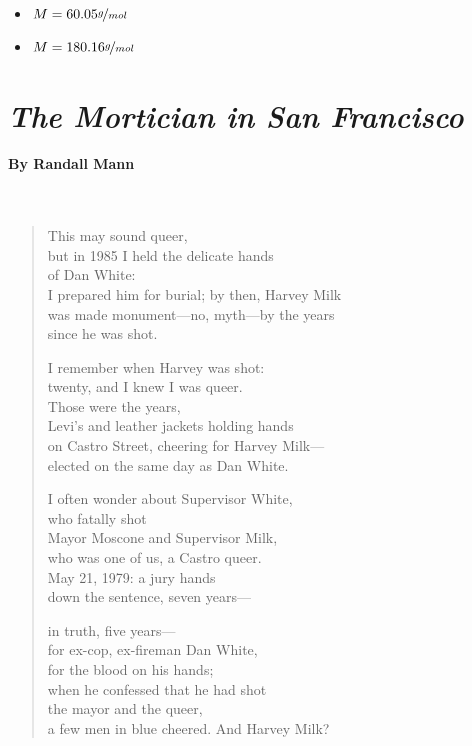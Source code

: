 \documentclass[11pt, letterpaper]{memoir}
\begin{document}
{\begin{itemize}
      \vspace{2em}
    \item $M=60.05\nicefrac{g}{mol}$

      \vspace{2em}
    \item $M=180.16\nicefrac{g}{mol}$

      \vspace{2em}
  \end{itemize}
\newpage
\pagestyle{empty}
\addtocounter{page}{-1}
\section*{\emph{The Mortician in San Francisco}}
\paragraph{By Randall Mann}~
\begin{verse}
	This may sound queer,\\
	but in 1985 I held the delicate hands\\
	of Dan White:\\
	I prepared him for burial; by then, Harvey Milk\\
	was made monument—no, myth—by the years\\
	since he was shot.

	I remember when Harvey was shot:\\
	twenty, and I knew I was queer.\\
	Those were the years,\\
	Levi’s and leather jackets holding hands\\
	on Castro Street, cheering for Harvey Milk—\\
	elected on the same day as Dan White.

	I often wonder about Supervisor White,\\
	who fatally shot\\
	Mayor Moscone and Supervisor Milk,\\
	who was one of us, a Castro queer.\\
	May 21, 1979: a jury hands\\
	down the sentence, seven years—

	in truth, five years—\\
	for ex-cop, ex-fireman Dan White,\\
	for the blood on his hands;\\
	when he confessed that he had shot\\
	the mayor and the queer,\\
	a few men in blue cheered. And Harvey Milk?


\end{verse}}
\end{document}
